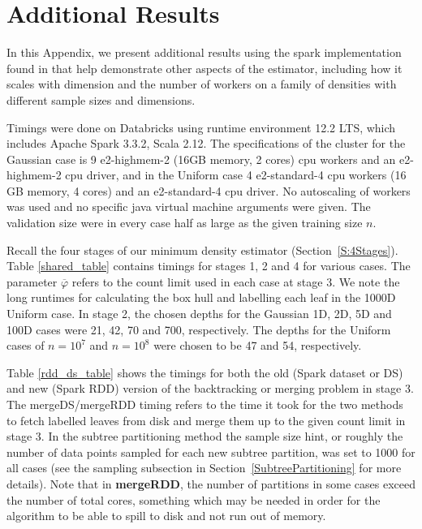 \documentclass{report}
\begin{document}
\appendix
\renewcommand\chaptername{Appendix}
\chapter{Additional Results}
In this Appendix, we present additional results using the spark implementation found in \cite{SparkDensityTree} that help demonstrate other aspects of the estimator, including how it scales with dimension and the number of workers on a family of densities with different sample sizes and dimensions.

Timings were done on Databricks using runtime environment 12.2 LTS, which includes Apache Spark 3.3.2, Scala 2.12. 
The specifications of the cluster for the Gaussian case is
9 e2-highmem-2 (16GB memory, 2 cores) cpu workers and an e2-highmem-2 cpu driver, and in the Uniform case 4 e2-standard-4 cpu workers (16 GB memory, 4 cores) and an e2-standard-4 cpu driver. 
No autoscaling of workers was used and no specific java virtual machine arguments were given. The validation size were in every case half as large as the given training size $n$. 

Recall the four stages of our minimum density estimator (Section~\ref{S:4Stages}). Table \ref{shared_table} contains timings for stages 1, 2 and 4 for various cases. The parameter $\overline{\varphi}$ refers to the count limit used in each case at stage 3. 
We note the long runtimes for calculating the box hull and labelling each leaf in the 1000D Uniform case. In stage 2, the chosen depths for the Gaussian 1D, 2D, 5D and 100D cases were 21, 42, 70 and 700, respectively. The depths for the Uniform cases of $n=10^7$ and $n=10^8$ were chosen to be 47 and 54, respectively.

Table \ref{rdd_ds_table} shows the timings for both the old (Spark dataset or DS) and new (Spark RDD) version of the backtracking or merging problem in stage 3. The mergeDS/mergeRDD timing refers to the time it 
took for the two methods to fetch labelled leaves from disk and merge them up to the given count limit in stage 3. 
In the subtree partitioning method the sample size hint, or roughly the number of data points sampled 
for each new subtree partition, was set to 1000 for all cases (see the sampling subsection in Section~\ref{SubtreePartitioning} for more details). Note that 
in \textbf{mergeRDD}, the number of partitions in some cases exceed the number of total cores, something which may be needed in order for the algorithm to be able to spill to disk
and not run out of memory. 
\end{document}
